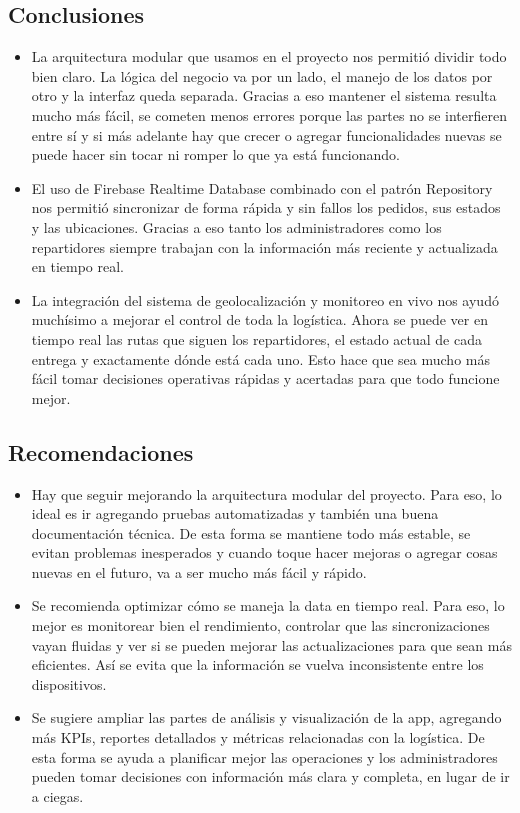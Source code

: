 \subsection{Conclusiones}
\begin{itemize}
    \item La arquitectura modular que usamos en el proyecto nos permitió dividir todo bien claro. La lógica del negocio va por un lado, el manejo de los datos por otro y la interfaz queda separada. Gracias a eso mantener el sistema resulta mucho más fácil, se cometen menos errores porque las partes no se interfieren entre sí y si más adelante hay que crecer o agregar funcionalidades nuevas se puede hacer sin tocar ni romper lo que ya está funcionando.
    
    \item El uso de Firebase Realtime Database combinado con el patrón Repository nos permitió sincronizar de forma rápida y sin fallos los pedidos, sus estados y las ubicaciones. Gracias a eso tanto los administradores como los repartidores siempre trabajan con la información más reciente y actualizada en tiempo real.

    \item La integración del sistema de geolocalización y monitoreo en vivo nos ayudó muchísimo a mejorar el control de toda la logística. Ahora se puede ver en tiempo real las rutas que siguen los repartidores, el estado actual de cada entrega y exactamente dónde está cada uno. Esto hace que sea mucho más fácil tomar decisiones operativas rápidas y acertadas para que todo funcione mejor.
\end{itemize}

\subsection{Recomendaciones}
\begin{itemize}
    \item Hay que seguir mejorando la arquitectura modular del proyecto. Para eso, lo ideal es ir agregando pruebas automatizadas y también una buena documentación técnica. De esta forma se mantiene todo más estable, se evitan problemas inesperados y cuando toque hacer mejoras o agregar cosas nuevas en el futuro, va a ser mucho más fácil y rápido.

    \item Se recomienda optimizar cómo se maneja la data en tiempo real. Para eso, lo mejor es monitorear bien el rendimiento, controlar que las sincronizaciones vayan fluidas y ver si se pueden mejorar las actualizaciones para que sean más eficientes. Así se evita que la información se vuelva inconsistente entre los dispositivos.
    
    \item Se sugiere ampliar las partes de análisis y visualización de la app, agregando más KPIs, reportes detallados y métricas relacionadas con la logística. De esta forma se ayuda a planificar mejor las operaciones y los administradores pueden tomar decisiones con información más clara y completa, en lugar de ir a ciegas.
\end{itemize}